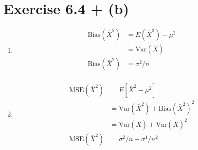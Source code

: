 \documentclass{article}
\newcommand{\var}{\text{Var}}
\newcommand{\bias}{\text{Bias}}
\begin{document}
	\section*{Exercise 6.4 + (b)}
	\begin{enumerate}[\quad(a)]
		\item
		\begin{align*}
		\bias(\bar{X}^2) &= E(\bar{X}^2) - \mu^2\\
		&= \var(\bar{X}) \\
		\bias(\bar{X}^2) &= \sigma^2/n\\
		\end{align*}
		\item
		\begin{align*}
			\text{MSE}(\bar{X}^2) &= E[\bar{X}^2 - \mu^2] \\
			&= \var(\bar{X}^2) + \bias(\bar{X}^2)^2\\
			 &= \var(\bar{X}) + \var(\bar{X})^2\\
			\text{MSE}(\bar{X}^2) &= \sigma^2/n + \sigma^4/n^2
		\end{align*}
	\end{enumerate}
\end{document}
